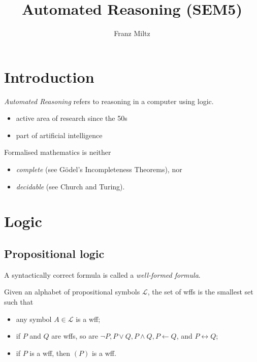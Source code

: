 \documentclass{article}
\title{Automated Reasoning (SEM5)}
\author{Franz Miltz}
\begin{document}
\maketitle
\tableofcontents
\pagebreak
\section{Introduction}
\begin{definition}
    \emph{Automated Reasoning} refers to reasoning in a computer using logic.
    \begin{itemize}
        \item active area of research since the 50s
        \item part of artificial intelligence
    \end{itemize}
\end{definition}
\begin{theorem}
    Formalised mathematics is neither
    \begin{itemize}
        \item \emph{complete} (see G\"odel's Incompleteness Theorems), nor
        \item \emph{decidable} (see Church and Turing).
    \end{itemize}
\end{theorem}

\section{Logic}
\subsection{Propositional logic}

\begin{definition}
    A syntactically correct formula is called a \emph{well-formed formula}.

    Given an alphabet of propositional symbols $\mathcal{L}$, the
    set of wffs is the smallest set such that 
    \begin{itemize}
        \item any symbol $A\in\mathcal{L}$ is a wff;
        \item if $P$ and $Q$ are wffs, so are $\neg P, P\vee Q, P\wedge Q, P\leftarrow Q$, and $P\leftrightarrow Q$;
        \item if $P$ is a wff, then $(P)$ is a wff.
    \end{itemize}
\end{definition}
\end{document}
